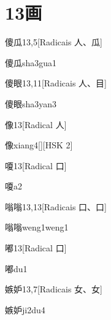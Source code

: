 
\section*{13画}

\begin{entry}{傻瓜}{13,5}[Radicais ⼈、⽠]
  \begin{phonetics}{傻瓜}{sha3gua1}
  \end{phonetics}
\end{entry}

\begin{entry}{傻眼}{13,11}[Radicais ⼈、⽬]
  \begin{phonetics}{傻眼}{sha3yan3}
  \end{phonetics}
\end{entry}

\begin{entry}{像}{13}[Radical ⼈]
  \begin{phonetics}{像}{xiang4}[][HSK 2]
  \end{phonetics}
\end{entry}

\begin{entry}{嗄}{13}[Radical ⼝]
  \begin{phonetics}{嗄}{a2}
  \end{phonetics}
\end{entry}

\begin{entry}{嗡嗡}{13,13}[Radicais ⼝、⼝]
  \begin{phonetics}{嗡嗡}{weng1weng1}
  \end{phonetics}
\end{entry}

\begin{entry}{嘟}{13}[Radical ⼝]
  \begin{phonetics}{嘟}{du1}
  \end{phonetics}
\end{entry}

\begin{entry}{嫉妒}{13,7}[Radicais ⼥、⼥]
  \begin{phonetics}{嫉妒}{ji2du4}
  \end{phonetics}
\end{entry}


